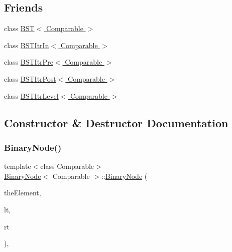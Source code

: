 \subsection*{Friends}
\begin{DoxyCompactItemize}
\item 
class \hyperlink{classBinaryNode_a28a1adb9906f3ff7e12c2cb6fa2bd54e}{B\+S\+T$<$ Comparable $>$}
\item 
class \hyperlink{classBinaryNode_aab3993acac2ab24a0b59edb0c3acc775}{B\+S\+T\+Itr\+In$<$ Comparable $>$}
\item 
class \hyperlink{classBinaryNode_a45a55df6f11541416d4ea7684c575c1a}{B\+S\+T\+Itr\+Pre$<$ Comparable $>$}
\item 
class \hyperlink{classBinaryNode_a5dc153694be266f6e772659486219da7}{B\+S\+T\+Itr\+Post$<$ Comparable $>$}
\item 
class \hyperlink{classBinaryNode_a26ff00bc0d87069aed877f10fd3c80a8}{B\+S\+T\+Itr\+Level$<$ Comparable $>$}
\end{DoxyCompactItemize}


\subsection{Constructor \& Destructor Documentation}
\mbox{\label{classBinaryNode_aff89d3679c077d70b67ad16e9816d884}} 
\subsubsection{\texorpdfstring{Binary\+Node()}{BinaryNode()}}
{\footnotesize\ttfamily template$<$class Comparable$>$ \\
\hyperlink{classBinaryNode}{Binary\+Node}$<$ Comparable $>$\+::\hyperlink{classBinaryNode}{Binary\+Node} (\begin{DoxyParamCaption}\item[{const Comparable \&}]{the\+Element,  }\item[{\hyperlink{classBinaryNode}{Binary\+Node}$<$ Comparable $>$ $\ast$}]{lt,  }\item[{\hyperlink{classBinaryNode}{Binary\+Node}$<$ Comparable $>$ $\ast$}]{rt }\end{DoxyParamCaption})\hspace{0.3cm}{\ttfamily [inline]}, {\ttfamily [private]}}



